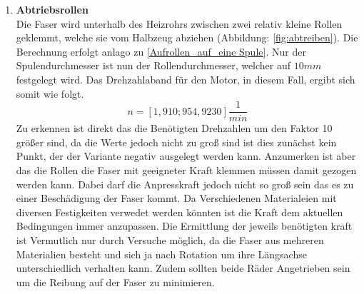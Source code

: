 \begin{enumerate}[label=(\alph*)]
 
    \item \textbf{Abtriebsrollen} \label{abtriebsrollen_c}\\
    Die Faser wird unterhalb des Heizrohrs zwischen zwei relativ kleine Rollen geklemmt, welche sie vom Halbzeug abziehen (Abbildung: \ref{fig:abtreiben}). Die Berechnung erfolgt anlago zu \ref{Aufrollen_auf_eine Spule}. Nur der Spulendurchmesser ist nun der Rollendurchmesser, welcher auf $10mm$ festgelegt wird. Das Drehzahlaband für den Motor, in diesem Fall, ergibt sich somit wie folgt.
    \begin{equation*}
        n = [1,910;954,9230]\frac{1}{min}
    \end{equation*}
    Zu erkennen ist direkt das die Benötigten Drehzahlen um den Faktor 10 größer sind, da die Werte jedoch nicht zu groß sind ist dies zunächst kein Punkt, der der Variante negativ ausgelegt werden kann. Anzumerken ist aber das die Rollen die Faser mit geeigneter Kraft klemmen müssen damit gezogen werden kann. Dabei darf die Anpresskraft jedoch nicht so groß sein das es zu einer Beschädigung der Faser kommt. Da Verschiedenen Materialeien mit diversen Festigkeiten verwedet werden könnten ist die Kraft dem aktuellen Bedingungen immer anzupassen. Die Ermittlung der jeweils benötigten kraft ist Vermutlich nur durch Versuche möglich, da die Faser aus mehreren Materialien besteht und sich ja nach Rotation um ihre Längsachse  unterschiedlich verhalten kann. Zudem sollten beide Räder Angetrieben sein um die Reibung auf der Faser zu minimieren. 
    


\end{enumerate}
